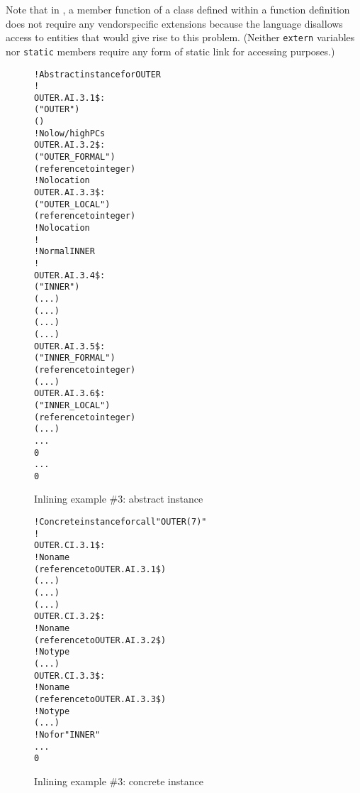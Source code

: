 Note that in , a member function of a class defined within
a function definition does not require any vendor\dash specific
extensions because the  language disallows access to
entities that would give rise to this problem. (Neither \texttt{extern}
variables nor \texttt{static} members require any form of static link
for accessing purposes.)

\begin{figure}[t]
\begin{dwflisting}
\begin{alltt}
    ! Abstract instance for OUTER
    ! 
OUTER.AI.3.1\$:
    \DWTAGsubprogram
        \DWATname("OUTER")
        \DWATinline(\DWINLdeclaredinlined)
        ! No low/high PCs
OUTER.AI.3.2\$:
        \DWTAGformalparameter
            \DWATname("OUTER\_FORMAL")
            \DWATtype(reference to integer)
            ! No location
OUTER.AI.3.3\$:
        \DWTAGvariable
            \DWATname("OUTER\_LOCAL")
            \DWATtype(reference to integer)
            ! No location
        !
        ! Normal INNER
        !
OUTER.AI.3.4\$:
        \DWTAGsubprogram
            \DWATname("INNER")
            \DWATlowpc(...)
            \DWAThighpc(...)
            \DWATframebase(...)
            \DWATstaticlink(...)
OUTER.AI.3.5\$:
            \DWTAGformalparameter
                \DWATname("INNER\_FORMAL")
                \DWATtype(reference to integer)
                \DWATlocation(...)
OUTER.AI.3.6\$:
            \DWTAGvariable
                \DWATname("INNER\_LOCAL")
                \DWATtype(reference to integer)
                \DWATlocation(...)
            ...
            0
        ...
        0
\end{alltt}
\end{dwflisting}
\caption{Inlining example \#3: abstract instance}
\label{fig:inliningexample3abstractinstance}
\end{figure}

\clearpage
\begin{figure}[t]
\begin{dwflisting}
\begin{alltt}
    ! Concrete instance for call "OUTER(7)"
    ! 
OUTER.CI.3.1\$:
    \DWTAGinlinedsubroutine
        ! No name
        \DWATabstractorigin(reference to OUTER.AI.3.1\$)
        \DWATlowpc(...)
        \DWAThighpc(...)
        \DWATframebase(...)
OUTER.CI.3.2\$:
        \DWTAGformalparameter
            ! No name
            \DWATabstractorigin(reference to OUTER.AI.3.2\$)
            ! No type
            \DWATlocation(...)
OUTER.CI.3.3\$:
        \DWTAGvariable
            ! No name
            \DWATabstractorigin(reference to OUTER.AI.3.3\$)
            ! No type
            \DWATlocation(...)
        ! No \DWTAGsubprogram for "INNER"
        ...
        0
\end{alltt}
\end{dwflisting}
\caption{Inlining example \#3: concrete instance}
\label{fig:inliningexample3concreteinstance}
\end{figure}

